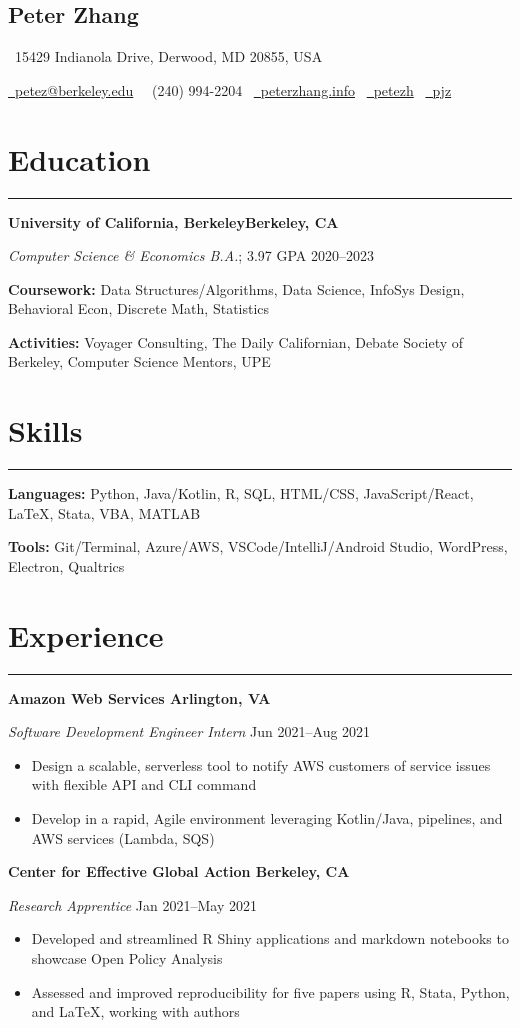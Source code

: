 \documentclass[11pt]{article}
\newcommand{\name}[1]{\begin{center}\section*{\huge \color{highlight} #1}\vspace{-0.5cm}\end{center}}
\newcommand{\topinfo}[1]{\begin{center}\vspace{-0.2cm}#1\vspace{-0.2cm}\end{center}}
\newcommand{\resumesection}[1]{\vspace{-0.6cm}\section*{\color{highlight}#1}\vspace{-0.3cm}\hrule\vspace{0.2cm}}
\begin{document}
\name{Peter Zhang}
\topinfo{\faHome \ 15429 Indianola Drive, Derwood, MD 20855, USA}
\topinfo{\href{mailto:petez@berkeley.edu}{\faEnvelope \ petez@berkeley.edu} \ \faPhone \ (240) 994-2204 \ \href{https://peterzhang.info/}{\faBriefcase \ peterzhang.info} \  \href{https://github.com/petezh}{\faGithub \ petezh} \  \href{https://www.linkedin.com/in/pjz/}{\faLinkedinSquare \ pjz}}

\resumesection{Education}

\textbf{University of California, Berkeley\hfill Berkeley, CA} \par
\textit{Computer Science \& Economics B.A.}; 3.97 GPA \hfill 2020--2023\par
\textbf{Coursework:} Data Structures/Algorithms, Data Science, InfoSys Design, Behavioral Econ, Discrete Math, Statistics\par
\textbf{Activities:} Voyager Consulting, The Daily Californian, Debate Society of Berkeley, Computer Science Mentors, UPE

\resumesection{Skills}

\textbf{Languages:} Python, Java/Kotlin, R, SQL, HTML/CSS, JavaScript/React, \LaTeX, Stata, VBA, MATLAB \par
\textbf{Tools:} Git/Terminal, Azure/AWS, VSCode/IntelliJ/Android Studio, WordPress, Electron, Qualtrics
\resumesection{Experience}

\textbf{Amazon Web Services \hfill Arlington, VA}\par

\textit{Software Development Engineer Intern} \hfill Jun 2021--Aug 2021
\begin{itemize}
	\item Design a scalable, serverless tool to notify AWS customers of service issues with flexible API and CLI command
	\item Develop in a rapid, Agile environment leveraging Kotlin/Java, pipelines, and AWS services (Lambda, SQS)
\end{itemize}\par

\textbf{Center for Effective Global Action \hfill Berkeley, CA}\par

\textit{Research Apprentice} \hfill Jan 2021--May 2021
\begin{itemize}
	\item Developed and streamlined R Shiny applications and markdown notebooks to showcase Open Policy Analysis
	\item Assessed and improved reproducibility for five papers using R, Stata, Python, and \LaTeX, working with authors
\end{itemize}\par
\end{document}
